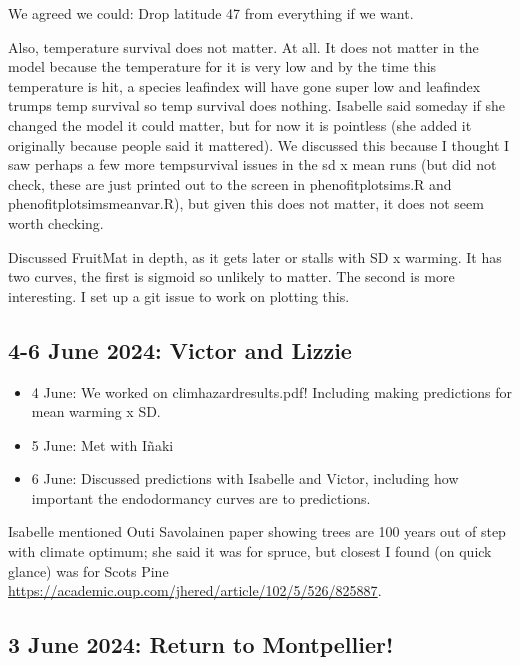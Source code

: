 \documentclass[11pt,letter]{article}
\begin{document}
We agreed we could: Drop latitude 47 from everything if we want. 

Also, temperature survival does not matter. At all. It does not matter in the model because the temperature for it is very low and by the time this temperature is hit, a species leafindex will have gone super low and leafindex trumps temp survival so temp survival does nothing. Isabelle said someday if she changed the model it could matter, but for now it is pointless (she added it originally because people said it mattered). We discussed this because I thought I saw perhaps a few more tempsurvival issues in the sd x mean runs (but did not check, these are just printed out to the screen in phenofitplotsims.R and phenofitplotsimsmeanvar.R), but given this does not matter, it does not seem worth checking.

Discussed FruitMat in depth, as it gets later or stalls with SD x warming. It has two curves, the first is sigmoid so unlikely to matter. The second is more interesting. I set up a git issue to work on plotting this. 

\subsection{4-6 June 2024: Victor and Lizzie}

\begin{itemize}
\item 4 June: We worked on climhazardresults.pdf! Including making predictions for mean warming x SD. \\
\item 5 June: Met with I\~naki \\
\item 6 June: Discussed predictions with Isabelle and Victor, including how important the endodormancy curves are to predictions. 
\end{itemize}

Isabelle mentioned Outi Savolainen paper showing trees are 100 years out of step with climate optimum; she said it was for spruce, but closest I found (on quick glance) was for Scots Pine \url{https://academic.oup.com/jhered/article/102/5/526/825887}.

\subsection{3 June 2024: Return to Montpellier!}
\end{document}
